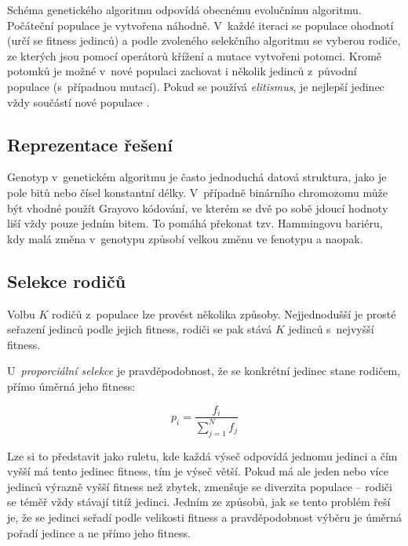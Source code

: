 
Schéma genetického algoritmu odpovídá obecnému evolučnímu algoritmu. Počáteční populace je vytvořena náhodně. V~každé iteraci se populace ohodnotí (určí se fitness jedinců) a podle zvoleného selekčního algoritmu se vyberou rodiče, ze kterých jsou pomocí operátorů křížení a mutace vytvořeni potomci. Kromě potomků je možné v~nové populaci zachovat i několik jedinců z~původní populace (s~případnou mutací). Pokud se používá \emph{elitismus}, je nejlepší jedinec vždy součástí nové populace \cite{HandbookEA, Modra}.


\subsection{Reprezentace řešení}

Genotyp v~genetickém algoritmu je často jednoduchá datová struktura, jako je pole bitů nebo čísel konstantní délky. V~případně binárního chromozomu může být vhodné použít Grayovo kódování, ve kterém se dvě po sobě jdoucí hodnoty liší vždy pouze jedním bitem. To pomáhá překonat tzv. Hammingovu bariéru, kdy malá změna v~genotypu způsobí velkou změnu ve fenotypu a naopak.


\subsection{Selekce rodičů}

Volbu $K$ rodičů z~populace lze provést několika způsoby. Nejjednodušší je prosté seřazení jedinců podle jejich fitness, rodiči se pak stává $K$ jedinců s~nejvyšší fitness.

U~\emph{proporciální selekce} je pravděpodobnost, že se konkrétní jedinec stane rodičem, přímo úměrná jeho fitness:

\begin{equation*}
p_i = \frac{f_i}{\sum_{j=1}^N{f_j}}
\end{equation*}

\noindent{}Lze si to představit jako ruletu, kde každá výseč odpovídá jednomu jedinci a čím vyšší má tento jedinec fitness, tím je výseč větší. Pokud má ale jeden nebo více jedinců výrazně vyšší fitness než zbytek, zmenšuje se diverzita populace -- rodiči se téměř vždy stávají titíž jedinci. Jedním ze způsobů, jak se tento problém řeší je, že se jedinci seřadí podle velikosti fitness a pravděpodobnost výběru je úměrná pořadí jedince a ne přímo jeho fitness.

